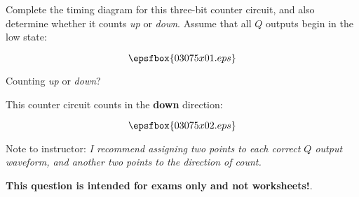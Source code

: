 

Complete the timing diagram for this three-bit counter circuit, and also determine whether it counts {\it up} or {\it down}.  Assume that all $Q$ outputs begin in the low state:

$$\epsfbox{03075x01.eps}$$

Counting {\it up} or {\it down}?







This counter circuit counts in the {\bf down} direction:

$$\epsfbox{03075x02.eps}$$

Note to instructor: {\it I recommend assigning two points to each correct $Q$ output waveform, and another two points to the direction of count.}







{\bf This question is intended for exams only and not worksheets!}.




